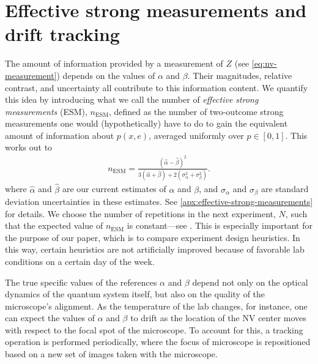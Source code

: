 \documentclass[aps,nofootinbib,twocolumn,superscriptaddress]{revtex4}
\newcommand{\mps}{x}
\newcommand{\eps}{e}
\newcommand{\ESM}{\text{ESM}}
\begin{document}
\section{Effective strong measurements and drift tracking}
\label{sec:esm-and-drift-tracking}

The amount of information provided by a measurement of $Z$ (see
\autoref{eq:nv-measurement}) depends on the values 
of $\alpha$ and $\beta$.
Their magnitudes, relative contrast, and uncertainty 
all contribute to this information content.
We quantify this idea by introducing what we call
the number of \textit{effective strong measurements} (ESM), 
$n_\ESM$,
defined as the number of two-outcome strong measurements one would
(hypothetically) have to do to gain the equivalent amount of 
information about $p(\mps,\eps)$, averaged uniformly over $p\in[0,1]$.
This works out to
\begin{align}
    n_\ESM = \frac{
            (\hat\alpha-\hat\beta)^2
        }{
            3(\hat\alpha+\hat\beta)+2\left(\sigma_\alpha^2+\sigma_\beta^2\right)
        }.
\end{align}
where $\hat\alpha$ and $\hat\beta$ are our current estimates of
$\alpha$ and $\beta$, and $\sigma_\alpha$ and $\sigma_\beta$ 
are standard deviation uncertainties in these estimates.
See \autoref{apx:effective-strong-measurements} for details.
We choose the number of repetitions in the next experiment, $N$, 
such that the expected value of $n_\ESM$ is constant---see
.
This is especially important for the purpose of our paper,
which is to compare experiment design heuristics.
In this way,
certain heuristics are not artificially improved because
of favorable lab conditions on a certain day of the week.

The true specific values of the references $\alpha$ and $\beta$ depend 
not only on the optical dynamics of the quantum system itself,
but also on the quality of the microscope's alignment.
As the temperature of the lab changes, for instance, one
can expect the values of $\alpha$ and $\beta$ to drift
as the location of the NV center moves with respect to the
focal spot of the microscope.
To account for this, a tracking operation is
performed periodically, where the focus of microscope is
repositioned based on a new set of images taken with the microscope.
\end{document}
